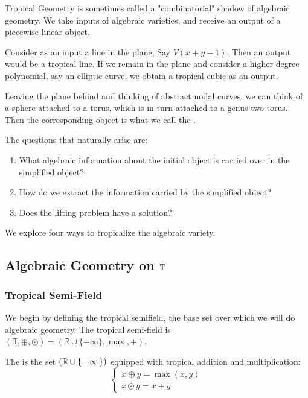 \documentclass[12pt]{memoir}
\theoremstyle{definition}
\def\RR{{\mathbb R}}
\begin{document}
Tropical Geometry is sometimes called a "combinatorial" shadow of algebraic geometry. We take inputs of algebraic varieties, and receive an output of a piecewise linear object.

\begin{Ex}
    Consider as an input a line in the plane, Say $V(x+y-1)$. Then an output would be a tropical line. If we remain in the plane and consider a higher degree polynomial, say an elliptic curve, we obtain a tropical cubic as an output.\par 
    Leaving the plane behind and thinking of abstract nodal curves, we can think of a sphere attached to a torus, which is in turn attached to a genus two torus. Then the corresponding object is what we call the .
\end{Ex}

The questions that naturally arise are:
\begin{enumerate}
    \item What algebraic information about the initial object is carried over in the simplified object?
    \item How do we extract the information carried by the simplified object?
    \item Does the lifting problem have a solution?
\end{enumerate}


We explore four ways to tropicalize the algebraic variety.

\subsection{Algebraic Geometry on $\mathbb{T}$}
\subsubsection{Tropical Semi-Field}
We begin by defining the tropical semifield, the base set over which we will do algebraic geometry. The tropical semi-field is $(\mathbb{T}, \oplus, \odot ) = ( \RR \cup \{- \infty\}, \max, + )$.\par

\begin{Def}
    The  is the set $(\mathbb{R}\cup\{\,-\infty\,\})$ equipped with tropical addition and multiplication:
    $$
    \begin{cases}
        x\oplus y=\max(x,y)\\
        x\odot y=x+y
    \end{cases}
    $$
\end{Def}
\end{document}
